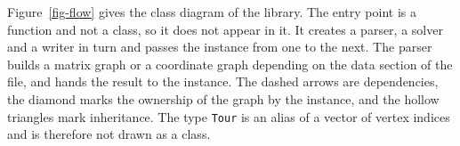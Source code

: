\documentclass[11pt,a4paper]{article}
\begin{document}
Figure~\ref{fig-flow} gives the class diagram of the library. The entry point is a function and not a class, so it does not appear in it. It creates a parser, a solver and a writer in turn and passes the instance from one to the next. The parser builds a matrix graph or a coordinate graph depending on the data section of the file, and hands the result to the instance. The dashed arrows are dependencies, the diamond marks the ownership of the graph by the instance, and the hollow triangles mark inheritance. The type \texttt{Tour} is an alias of a vector of vertex indices and is therefore not drawn as a class.

\end{document}
